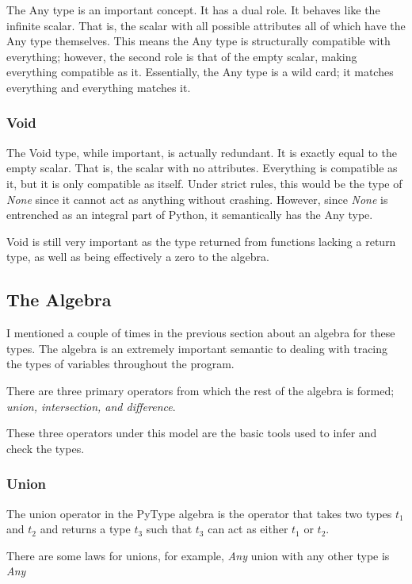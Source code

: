 \documentclass{scrartcl}
\begin{document}
\begin{multicols}{2}
The Any type is an important concept. It has a dual role.  It behaves like the
infinite scalar. That is, the scalar with all possible attributes all of which
have the Any type themselves. This means the Any type is structurally compatible
with everything; however, the second role is that of the empty scalar, making
everything compatible as it. Essentially, the Any type is a wild card; it matches
everything and everything matches it.

\subsubsection*{Void}

The Void type, while important, is actually redundant. It is exactly equal to the
empty scalar. That is, the scalar with no attributes. Everything is compatible
as it, but it is only compatible as itself. Under strict rules, this would be the
type of \emph{None} since it cannot act as anything without crashing. However,
since \emph{None} is entrenched as an integral part of Python, it semantically
has the Any type.

Void is still very important as the type returned from functions lacking a return
type, as well as being effectively a zero to the algebra.


\subsection*{The Algebra}

I mentioned a couple of times in the previous section about an algebra for these types.
The algebra is an extremely important semantic to dealing with tracing the
types of variables throughout the program.

There are three primary operators from which the rest of the algebra is formed;
\emph{union, intersection, and difference}.

These three operators under this model are the basic tools used to infer and check
the types.

\subsubsection*{Union}

The union operator in the PyType algebra is the operator that takes
two types $t_1$ and $t_2$ and returns a type $t_3$ such that $t_3$ can
act as either $t_1$ or $t_2$.

There are some laws for unions, for example, \emph{Any} union with any
other type is \emph{Any}


\end{multicols}
\end{document}
